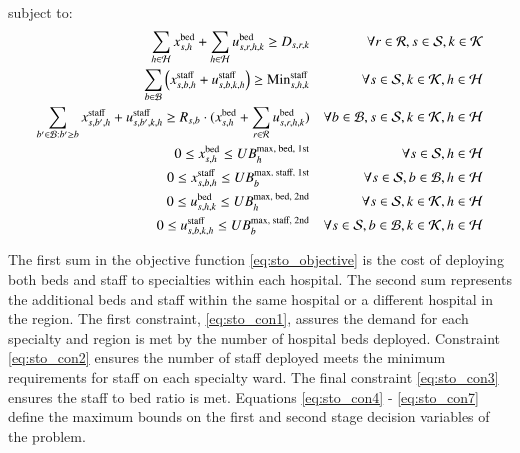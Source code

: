 \documentclass[../thesis.tex]{subfiles}
\begin{document}
{subject to:
\begin{align}
    \sum_{h\in\mathcal{H}} x^\textnormal{bed}_{s,h} +  \sum_{h\in\mathcal{H}} u^\textnormal{bed}_{s,r,h,k} \geq D_{s,r,k} & & \forall r \in \mathcal{R}, s \in \mathcal{S}, k \in \mathcal{K} \label{eq:sto_con1}\\
    \sum\limits_{b\in\mathcal{B}} \left(x^\textnormal{staff}_{s,b,h} +u^\textnormal{staff}_{s,b,k,h} \right) \geq \textnormal{Min}^\textnormal{staff}_{s,h,k}& & \forall s \in \mathcal{S}, k \in \mathcal{K}, h \in \mathcal{H} \label{eq:sto_con2}\\ 
    \sum\limits_{b'\in\mathcal{B}: b'\geq b} x^\textnormal{staff}_{s,b',h} + u^\textnormal{staff}_{s,b',k,h} \geq R_{s,b} \cdot (x^\textnormal{bed}_{s,h} +  \sum\limits_{r\in\mathcal{R}} u^\textnormal{bed}_{s,r,h,k} ) & & \forall b \in \mathcal{B}, s \in \mathcal{S}, k \in \mathcal{K}, h \in \mathcal{H}\label{eq:sto_con3}\\
    0 \leq x^\textnormal{bed}_{s,h} \leq UB^\textnormal{max, bed, 1st}_h & &\forall s \in \mathcal{S}, h \in \mathcal{H}\label{eq:sto_con4}\\
    0 \leq x^\textnormal{staff}_{s,b,h} \leq UB^\textnormal{max, staff, 1st}_{b}& & \forall s \in \mathcal{S}, b \in \mathcal{B}, h \in \mathcal{H}\label{eq:sto_con5}\\
    0 \leq u^\textnormal{bed}_{s,h,k} \leq UB_h^\textnormal{max, bed, 2nd} & & \forall s \in \mathcal{S}, k \in \mathcal{K},  h \in \mathcal{H}\label{eq:sto_con6}\\
    0 \leq u^\textnormal{staff}_{s,b,k,h} \leq UB^\textnormal{max, staff, 2nd}_{b}& & \forall s \in \mathcal{S}, b \in \mathcal{B}, k \in \mathcal{K}, h \in \mathcal{H}\label{eq:sto_con7}
\end{align}

The first sum in the objective function \eqref{eq:sto_objective} is the cost of deploying both beds and staff to specialties within each hospital. The second sum represents the additional beds and staff within the same hospital or a different hospital in the region. The first constraint, \eqref{eq:sto_con1}, assures the demand for each specialty and region is met by the number of hospital beds deployed. Constraint \eqref{eq:sto_con2} ensures the number of staff deployed meets the minimum requirements for staff on each specialty ward. The final constraint \eqref{eq:sto_con3} ensures the staff to bed ratio is met. Equations \eqref{eq:sto_con4} - \eqref{eq:sto_con7} define the maximum bounds on the first and second stage decision variables of the problem.\\

}
\end{document}
